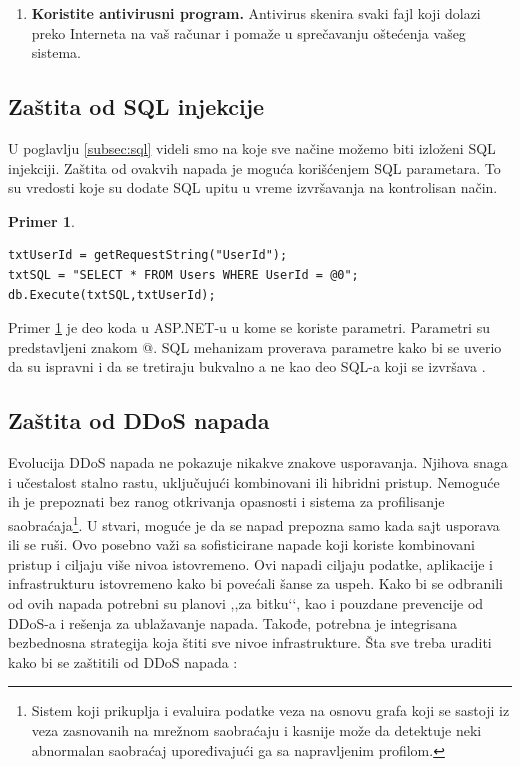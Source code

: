 \documentclass[a4paper]{article}
\theoremstyle{break}
\newtheorem{primer}{Primer}[subsection]
\begin{document}
{\begin{enumerate}
\item \textbf{Koristite antivirusni program.} Antivirus skenira svaki fajl koji dolazi preko Interneta na vaš računar i pomaže u sprečavanju oštećenja vašeg sistema.

\end{enumerate}

\subsection{Zaštita od SQL injekcije}
\label{subsec:zastita_od_sql_injekcije}

U poglavlju \ref{subsec:sql} videli smo na koje sve načine možemo biti izloženi SQL injekciji. Zaštita od ovakvih napada je moguća korišćenjem SQL parametara. To su vredosti koje su dodate SQL upitu u vreme izvršavanja na kontrolisan način.

\begin{primer}
\label{primer_3}
\begin{lstlisting}[frame=single]
txtUserId = getRequestString("UserId");
txtSQL = "SELECT * FROM Users WHERE UserId = @0";
db.Execute(txtSQL,txtUserId);
\end{lstlisting}
\end{primer}
\noindent Primer \ref{primer_3} je deo koda u ASP.NET-u u kome se koriste parametri. Parametri su predstavljeni znakom @. SQL mehanizam proverava parametre kako bi se uverio da su ispravni i da se tretiraju bukvalno a ne kao deo SQL-a koji se izvršava \cite{sql_injection}.

\subsection{Zaštita od DDoS napada}
\label{subsec:zastita_od_ddosa}

Evolucija DDoS napada ne pokazuje nikakve znakove usporavanja. Njihova snaga i učestalost stalno rastu, uključujući kombinovani ili hibridni pristup. Nemoguće ih je prepoznati bez ranog otkrivanja opasnosti i sistema za profilisanje saobraćaja\footnote{Sistem koji prikuplja i evaluira podatke veza na osnovu grafa koji se sastoji iz veza zasnovanih na mrežnom saobraćaju i kasnije može da detektuje neki abnormalan saobraćaj upoređivajući ga sa napravljenim profilom.}. U stvari, moguće je da se napad prepozna samo kada  sajt usporava ili se ruši. Ovo posebno važi sa sofisticirane napade koji koriste kombinovani pristup i ciljaju više nivoa istovremeno. Ovi napadi ciljaju podatke, aplikacije i infrastrukturu istovremeno kako bi povećali šanse za uspeh. Kako bi se odbranili od ovih napada potrebni su planovi ,,za bitku‘‘, kao i pouzdane prevencije od DDoS-a i rešenja za ublažavanje napada. Takođe, potrebna je integrisana bezbednosna strategija koja štiti sve nivoe infrastrukture. Šta sve treba uraditi kako bi se zaštitili od DDoS napada \cite{ddos_protect}:

}
\end{document}
